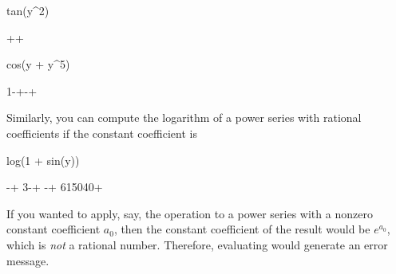 {{{{{{{{{{{{{{\begin{xtc}
\begin{spadsrc}
tan(y^2) 
\end{spadsrc}
\begin{TeXOutput}
\begin{fricasmath}{6}
+\TIMES {}+%
\end{fricasmath}
\end{TeXOutput}
\end{xtc}
%
\begin{xtc}
\begin{xtccomment}
\end{xtccomment}
\begin{spadsrc}
cos(y + y^5) 
\end{spadsrc}
\begin{TeXOutput}
\begin{fricasmath}{7}
1-{\TIMES {}}+\TIMES {}-{\TIMES {}}+%
\end{fricasmath}
\end{TeXOutput}
\end{xtc}
%
%
\begin{xtc}
\begin{xtccomment}
Similarly, you can compute the logarithm of a power series with rational
coefficients if the constant coefficient is 
\end{xtccomment}
\begin{spadsrc}
log(1 + sin(y)) 
\end{spadsrc}
\begin{TeXOutput}
\begin{fricasmath}{8}
-{\TIMES {}}+\TIMES \SUPER%
{}{3}-{\TIMES {}}+%
\TIMES {}-{\TIMES {}}+\frac%
{61}{5040}\TIMES {}+%
\end{fricasmath}
\end{TeXOutput}
\end{xtc}
%
If you wanted to apply, say, the operation  to a power
series with a nonzero constant coefficient $a_0$,
then the constant coefficient of the result would be
$e^{a_0}$, which is {\it not} a rational number.
Therefore, evaluating  would generate an error
message.

}}}}}}}}}}}}}}
